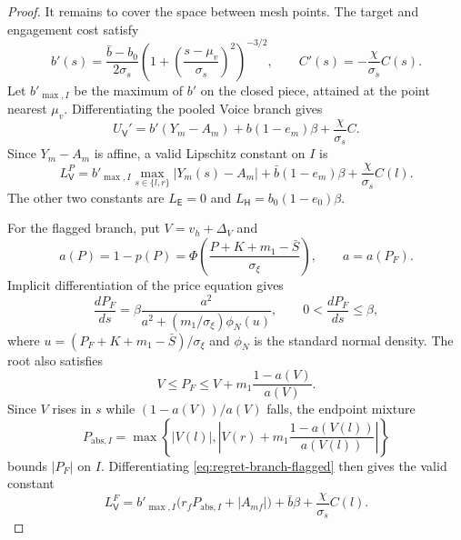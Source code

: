 \begin{proof}
It remains to cover the space between mesh points. The target and engagement cost satisfy
\[
b'(s)=\frac{\bar b-b_0}{2\sigma_s}
\left(1+\left(\frac{s-\mu_v}{\sigma_s}\right)^2\right)^{-3/2},
\qquad
C'(s)=-\frac{\chi}{\sigma_s}C(s).
\]
Let $b'_{\max,I}$ be the maximum of $b'$ on the closed piece, attained at the point nearest
$\mu_v$. Differentiating the pooled Voice branch gives
\[
U_{\mathsf{V}}'=b'(Y_m-A_m)+b(1-e_m)\beta+\frac{\chi}{\sigma_s}C.
\]
Since $Y_m-A_m$ is affine, a valid Lipschitz constant on $I$ is
\begin{equation}
\label{eq:regret-LP}
L_{\mathsf{V}}^{P}
=b'_{\max,I}\max_{s\in\{l,r\}}|Y_m(s)-A_m|
+\bar b(1-e_m)\beta+\frac{\chi}{\sigma_s}C(l).
\end{equation}
The other two constants are $L_{\mathsf{E}}=0$ and
$L_{\mathsf{H}}=b_0(1-e_0)\beta$.

For the flagged branch, put $V=v_h+\Delta_V$ and
\[
a(P)=1-p(P)=\Phi\!\left(\frac{P+K+m_1-\bar S}{\sigma_\xi}\right),
\qquad a=a(P_F).
\]
Implicit differentiation of the price equation gives
\begin{equation}
\label{eq:regret-price-derivative}
\frac{dP_F}{ds}
=\beta\frac{a^2}{a^2+(m_1/\sigma_\xi)\phi_{\!N}(u)},
\qquad
0<\frac{dP_F}{ds}\le\beta,
\end{equation}
where $u=(P_F+K+m_1-\bar S)/\sigma_\xi$ and $\phi_{\!N}$ is the standard normal density. The root
also satisfies
\[
V\le P_F\le V+m_1\frac{1-a(V)}{a(V)}.
\]
Since $V$ rises in $s$ while $(1-a(V))/a(V)$ falls, the endpoint mixture
\[
P_{\mathrm{abs},I}
=\max\left\{|V(l)|,
\left|V(r)+m_1\frac{1-a(V(l))}{a(V(l))}\right|\right\}
\]
bounds $|P_F|$ on $I$. Differentiating \eqref{eq:regret-branch-flagged} then gives the valid constant
\begin{equation}
\label{eq:regret-LF}
L_{\mathsf{V}}^{F}
=b'_{\max,I}\bigl(r_fP_{\mathrm{abs},I}+|A_{mf}|\bigr)
+\bar b\beta+\frac{\chi}{\sigma_s}C(l).
\end{equation}


\end{proof}
